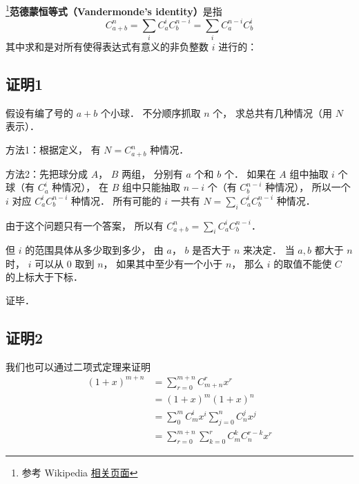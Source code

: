 

\footnote{参考 Wikipedia \href{https://en.wikipedia.org/wiki/Vandermonde's_identity}{相关页面}}\textbf{范德蒙恒等式（Vandermonde's identity）}是指
\begin{equation}
C_{a + b}^n = \sum_i C_a^i C_b^{n-i} = \sum\limits_i C_a^{n-i}C_b^i
\end{equation}
其中求和是对所有使得表达式有意义的非负整数 $i$ 进行的：

\subsection{证明1}

假设有编了号的 $a+b$ 个小球． 不分顺序抓取 $n$ 个， 求总共有几种情况（用 $N$ 表示）．

方法1：根据定义， 有 $N = C_{a+b}^n$ 种情况．

方法2：先把球分成 $A$，  $B$ 两组， 分别有 $a$ 个和 $b$ 个． 如果在 $A$ 组中抽取 $i$ 个球（有 $C_a^i$ 种情况）， 在 $B$ 组中只能抽取  $n - i$ 个（有 $C_b^{n-i}$ 种情况）， 所以一个 $i$ 对应 $C_a^i C_b^{n-i}$ 种情况． 所有可能的 $i$ 一共有 $N = \sum_i C_a^i C_b^{n-i}$ 种情况．

由于这个问题只有一个答案， 所以有 $C_{a+b}^n = \sum_i C_a^i C_b^{n-i}$． 

但 $i$ 的范围具体从多少取到多少， 由 $a$，  $b$ 是否大于 $n$ 来决定． 当 $a,b$ 都大于 $n$ 时， $i$ 可以从 0 取到 $n$，  如果其中至少有一个小于 $n$，  那么 $i$ 的取值不能使 $C$ 的上标大于下标．

证毕．

\subsection{证明2}
我们也可以通过二项式定理来证明
\begin{equation}
\begin{aligned}
(1 + x)^{m+n} &= \sum_{r=0}^{m+n} C_{m+n}^r x^r\\
&=(1+x)^m (1+x)^n\\
&=\sum_0^m C_m^i x^i  \sum_{j=0}^n C_n^j x^j\\
&=\sum_{r=0}^{m+n} \sum_{k=0}^r C_m^k C_n^{r-k} x^r
\end{aligned}
\end{equation}
